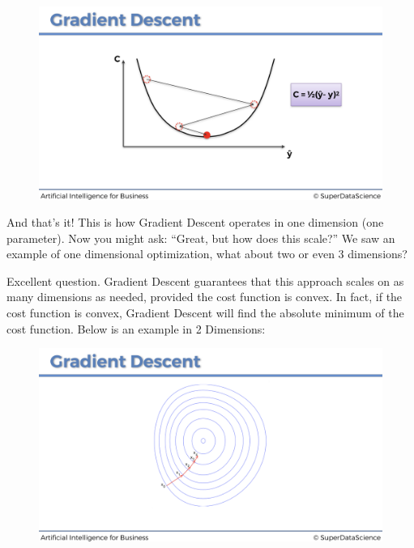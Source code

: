 \documentclass[]{book}
\begin{document}
\begin{figure}[!htbp]
        \begin{center}
            \includegraphics[scale=0.18]{ANN_23.png}
        \end{center}
\end{figure}

And that's it! This is how Gradient Descent operates in one dimension (one parameter). Now you might ask: ``Great, but how does this scale?'' We saw an example of one dimensional optimization, what about two or even 3 dimensions?

Excellent question. Gradient Descent guarantees that this approach scales on as many dimensions as needed, provided the cost function is convex. In fact, if the cost function is convex, Gradient Descent will find the absolute minimum of the cost function. Below is an example in 2 Dimensions:

\begin{figure}[!htbp]
        \begin{center}
            \includegraphics[scale=0.15]{ANN_24.png}
        \end{center}
\end{figure}
\end{document}
